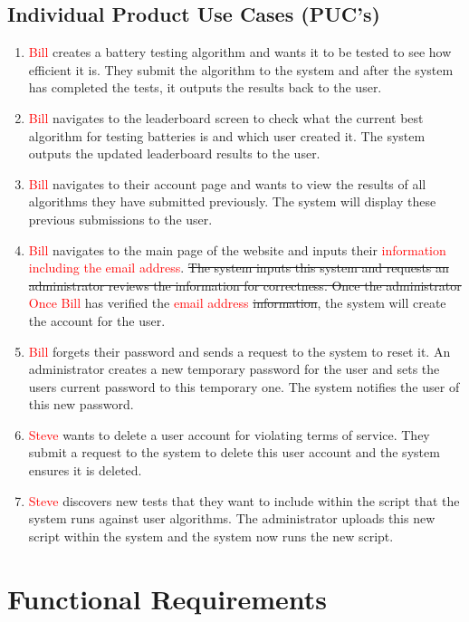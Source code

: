 \documentclass[12pt]{article}
\begin{document}
\subsection{Individual Product Use Cases (PUC's)}
\begin{enumerate}
    \item \textcolor{red}{Bill} creates a battery testing algorithm and wants it to be tested to see how efficient it is. They submit the algorithm to the system and after the system has completed the tests, it outputs the results back to the user.
    \item \textcolor{red}{Bill} navigates to the leaderboard screen to check what the current best algorithm for testing batteries is and which user created it. The system outputs the updated leaderboard results to the user.
    \item \textcolor{red}{Bill} navigates to their account page and wants to view the results of all algorithms they have submitted previously. The system will display these previous submissions to the user.
    \item \textcolor{red}{Bill} navigates to the main page of the website and inputs their \textcolor{red}{information including the email address}. \sout{The system inputs this system and requests an administrator reviews the information for correctness. Once the administrator} \textcolor{red}{Once Bill} has verified the \textcolor{red}{email address} \sout{information}, the system will create the account for the user.
    \item \textcolor{red}{Bill} forgets their password and sends a request to the system to reset it. An administrator creates a new temporary password for the user and sets the users current password to this temporary one. The system notifies the user of this new password.
    \item \textcolor{red}{Steve} wants to delete a user account for violating terms of service. They submit a request to the system to delete this user account and the system ensures it is deleted.
    \item \textcolor{red}{Steve} discovers new tests that they want to include within the script that the system runs against user algorithms. The administrator uploads this new script within the system and the system now runs the new script.
\end{enumerate}


\section{Functional Requirements}
\end{document}
